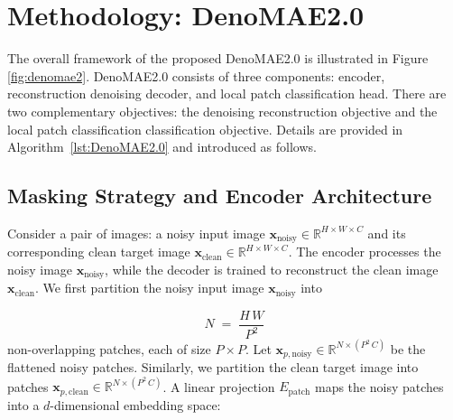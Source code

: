 \section{Methodology: DenoMAE2.0}

The overall framework of the proposed DenoMAE2.0 is illustrated in Figure \ref{fig:denomae2}. DenoMAE2.0 consists of three components: encoder, reconstruction denoising decoder, and local patch classification head. There are two complementary objectives: the denoising reconstruction objective and the local patch classification classification objective. Details are provided in Algorithm~\ref{lst:DenoMAE2.0} and introduced as follows.


\subsection{Masking Strategy and Encoder Architecture}



Consider a pair of images: a noisy input image \(\mathbf{x}_{\text{noisy}} \in \mathbb{R}^{H \times W \times C}\) and its corresponding clean target image \(\mathbf{x}_{\text{clean}} \in \mathbb{R}^{H \times W \times C}\). The encoder processes the noisy image \(\mathbf{x}_{\text{noisy}}\), while the decoder is trained to reconstruct the clean image \(\mathbf{x}_{\text{clean}}\). We first partition the noisy input image \(\mathbf{x}_{\text{noisy}}\) into 

\begin{equation}
N \;=\; \frac{H\,W}{P^2}
\label{eq:num_patches}
\end{equation}
non-overlapping patches, each of size \(P \times P\). Let \(\mathbf{x}_{p,\text{noisy}} \in \mathbb{R}^{N \times (P^2\,C)}\) be the flattened noisy patches. Similarly, we partition the clean target image into patches \(\mathbf{x}_{p,\text{clean}} \in \mathbb{R}^{N \times (P^2\,C)}\). A linear projection \(E_{\mathrm{patch}}\) maps the noisy patches into a \(d\)-dimensional embedding space:

